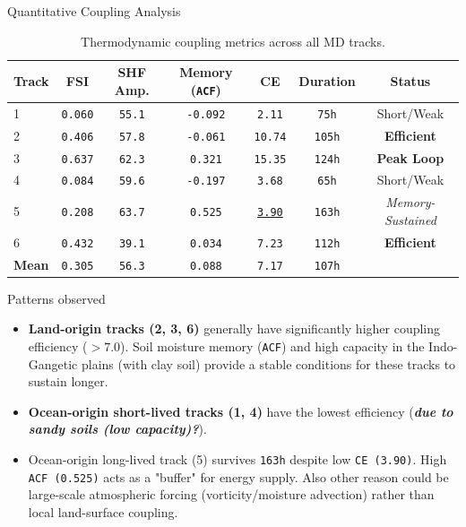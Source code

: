 \documentclass[8pt, aspectratio=169]{beamer}
\begin{document}
\begin{frame}{Quantitative Coupling Analysis}
    \vspace{-0.3cm}
    \begin{table}[H]
        \footnotesize
        \centering
        \caption{Thermodynamic coupling metrics across all MD tracks.}
        \begin{tabular}{lcccccc}
            \toprule
            \textbf{Track} & \textbf{FSI} & \textbf{SHF Amp.} & \textbf{Memory (\texttt{ACF})} & \textbf{CE} & \textbf{Duration} & \textbf{Status} \\
            \midrule
            1 & \texttt{0.060} & \texttt{55.1} & \texttt{-0.092} & \texttt{2.11}  & \texttt{75h}  & Short/Weak \\
            2 & \texttt{0.406} & \texttt{57.8} & \texttt{-0.061} & \texttt{10.74} & \texttt{105h} & \textbf{Efficient} \\
            3 & \texttt{0.637} & \texttt{62.3} & \texttt{0.321}  & \texttt{15.35} & \texttt{124h} & \textbf{Peak Loop} \\
            4 & \texttt{0.084} & \texttt{59.6} & \texttt{-0.197} & \texttt{3.68}  & \texttt{65h}  & Short/Weak \\
            5 & \texttt{0.208} & \texttt{63.7} & \texttt{0.525}  & \underline{\texttt{3.90}}  & \texttt{163h} & \textit{Memory-Sustained} \\
            6 & \texttt{0.432} & \texttt{39.1} & \texttt{0.034}  & \texttt{7.23}  & \texttt{112h} & \textbf{Efficient} \\
            \midrule
            \textbf{Mean} & \texttt{0.305} & \texttt{56.3} & \texttt{0.088} & \texttt{7.17} & \texttt{107h} & \\
            \bottomrule
        \end{tabular}
    \end{table}

    \footnotesize
    \begin{block}{Patterns observed}
        \begin{itemize}
            \item \textbf{Land-origin tracks (2, 3, 6)} generally have significantly higher coupling efficiency ($>7.0$). Soil moisture memory (\texttt{ACF}) and high capacity in the Indo-Gangetic plains (with clay soil) provide a stable conditions for these tracks to sustain longer.
            \item \textbf{Ocean-origin short-lived tracks (1, 4)} have the lowest efficiency (\textbf{\textit{due to sandy soils (low capacity)?}}).
            \item Ocean-origin long-lived track (5) survives \texttt{163h} despite low \texttt{CE (3.90)}. High \texttt{ACF (0.525)} acts as a "buffer" for energy supply. Also other reason could be large-scale atmospheric forcing (vorticity/moisture advection) rather than local land-surface coupling.
        \end{itemize}
    \end{block}
\end{frame}
\end{document}
